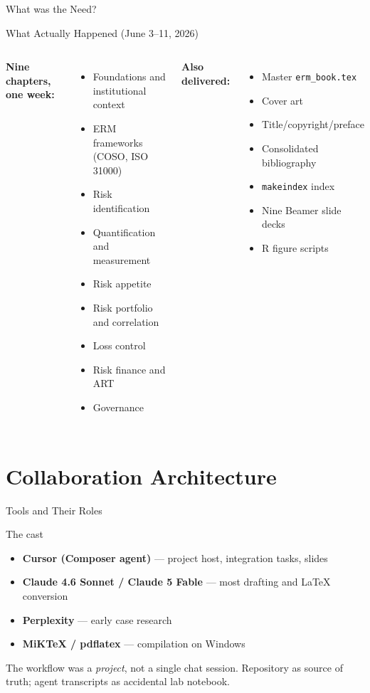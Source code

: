\documentclass[11pt, aspectratio=169]{beamer}
\begin{document}
\begin{frame}{What was the Need?}
\begin{frame}{What Actually Happened (June 3--11, 2026)}
\begin{columns}[T]
\textbf{Nine chapters, one week:}
\begin{itemize}
  \item Foundations and institutional context
  \item ERM frameworks (COSO, ISO 31000)
  \item Risk identification
  \item Quantification and measurement
  \item Risk appetite
  \item Risk portfolio and correlation
  \item Loss control
  \item Risk finance and ART
  \item Governance
\end{itemize}
\textbf{Also delivered:}
\begin{itemize}
  \item Master \texttt{erm\_book.tex}
  \item Cover art
  \item Title/copyright/preface
  \item Consolidated bibliography
  \item \texttt{makeindex} index
  \item Nine Beamer slide decks
  \item R figure scripts
\end{itemize}
\end{columns}
\end{frame}

\section{Collaboration Architecture}

\begin{frame}{Tools and Their Roles}
\begin{block}{The cast}
\begin{itemize}
  \item \textbf{Cursor (Composer agent)} --- project host, integration tasks, slides
  \item \textbf{Claude 4.6 Sonnet / Claude 5 Fable} --- most drafting and \LaTeX{} conversion
  \item \textbf{Perplexity} --- early case research
  \item \textbf{MiKTeX / pdflatex} --- compilation on Windows
\end{itemize}
\end{block}
\medskip
The workflow was a \emph{project}, not a single chat session.
Repository as source of truth; agent transcripts as accidental lab notebook.
\end{frame}


\end{frame}
\end{document}
